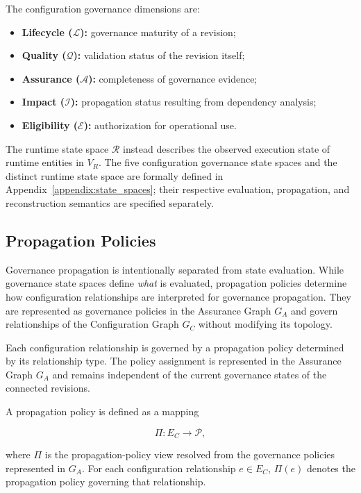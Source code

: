 \documentclass[10pt]{article}
\begin{document}
The configuration governance dimensions are:

\begin{itemize}
	\item \textbf{Lifecycle ($\mathcal{L}$):} governance maturity of a revision;
	\item \textbf{Quality ($\mathcal{Q}$):} validation status of the revision itself;
	\item \textbf{Assurance ($\mathcal{A}$):} completeness of governance evidence;
	\item \textbf{Impact ($\mathcal{I}$):} propagation status resulting from dependency analysis;
	\item \textbf{Eligibility ($\mathcal{E}$):} authorization for operational use.
\end{itemize}

The runtime state space $\mathcal{R}$ instead describes the observed execution
state of runtime entities in $V_R$. The five configuration governance state
spaces and the distinct runtime state space are formally defined in
Appendix~\ref{appendix:state_spaces}; their respective evaluation,
propagation, and reconstruction semantics are specified separately.

\subsection{Propagation Policies}
\label{sec:propagation_policies}

Governance propagation is intentionally separated from state evaluation. While governance state spaces define \emph{what} is evaluated, propagation policies determine how configuration relationships are interpreted for governance propagation. They are represented as governance policies in the Assurance Graph $G_A$ and govern relationships of the Configuration Graph $G_C$ without modifying its topology.

Each configuration relationship is governed by a propagation policy determined by its relationship type. The policy assignment is represented in the Assurance Graph $G_A$ and remains independent of the current governance states of the connected revisions.

A propagation policy is defined as a mapping

\begin{equation}
	\Pi:E_C\rightarrow\mathcal P,
	\label{eq:policy_mapping}
\end{equation}

where $\Pi$ is the propagation-policy view resolved from the governance policies represented in $G_A$. For each configuration relationship $e\in E_C$, $\Pi(e)$ denotes the propagation policy governing that relationship.
\end{document}
